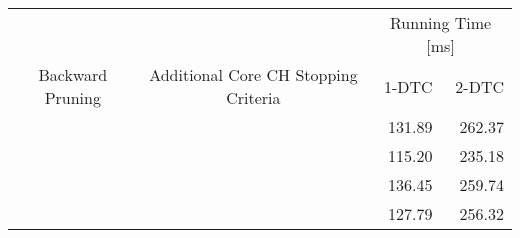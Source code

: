 \begin{tabular}{ccrr}
	\toprule
	                 &                                      & \multicolumn{2}{c}{Running Time [\si{\milli\second}]}         \\
	Backward Pruning & Additional Core CH Stopping Criteria & 1-DTC                                                 & 2-DTC \\
	\midrule
	\xmark           & \xmark                               & 131.89                                                     & 262.37     \\
	\cmark           & \xmark                               & 115.20                                                     & 235.18     \\
	\xmark           & \cmark                               & 136.45                                                     & 259.74     \\
	\cmark           & \cmark                               & 127.79                                                     & 256.32     \\
	\bottomrule
\end{tabular}